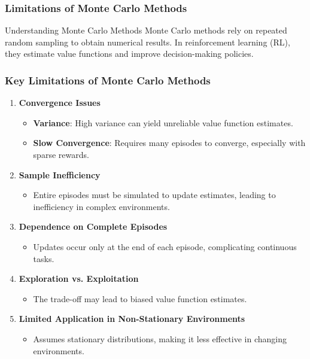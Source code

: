 \documentclass[aspectratio=169]{beamer}
\begin{document}
\begin{frame}[fragile]
    \frametitle{Limitations of Monte Carlo Methods}
    \begin{block}{Understanding Monte Carlo Methods}
        Monte Carlo methods rely on repeated random sampling to obtain numerical results. In reinforcement learning (RL), they estimate value functions and improve decision-making policies.
    \end{block}
\end{frame}

\begin{frame}[fragile]
    \frametitle{Key Limitations of Monte Carlo Methods}
    \begin{enumerate}
        \item \textbf{Convergence Issues}
        \begin{itemize}
            \item \textbf{Variance}: High variance can yield unreliable value function estimates.
            \item \textbf{Slow Convergence}: Requires many episodes to converge, especially with sparse rewards.
        \end{itemize}
        
        \item \textbf{Sample Inefficiency}
        \begin{itemize}
            \item Entire episodes must be simulated to update estimates, leading to inefficiency in complex environments.
        \end{itemize}
        
        \item \textbf{Dependence on Complete Episodes}
        \begin{itemize}
            \item Updates occur only at the end of each episode, complicating continuous tasks.
        \end{itemize}
        
        \item \textbf{Exploration vs. Exploitation}
        \begin{itemize}
            \item The trade-off may lead to biased value function estimates.
        \end{itemize}
        
        \item \textbf{Limited Application in Non-Stationary Environments}
        \begin{itemize}
            \item Assumes stationary distributions, making it less effective in changing environments.
        \end{itemize}
    \end{enumerate}
\end{frame}
\end{document}
